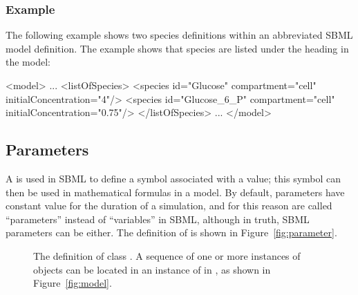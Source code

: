 \subsubsection{Example}

The following example shows two species definitions within an
abbreviated SBML model definition.  The example shows that species
are listed under the heading  in the model:

\begin{example}
<model>
    ...
    <listOfSpecies>
        <species id="Glucose" compartment="cell" initialConcentration="4"/>
        <species id="Glucose_6_P" compartment="cell" initialConcentration="0.75"/>
    </listOfSpecies>
    ...
</model>
\end{example}


\subsection{Parameters}
\label{sec:parameters}

A \Parameter is used in SBML to define a symbol associated with a
value; this symbol can then be used in mathematical formulas in a
model.  By default, parameters have constant value for the
duration of a simulation, and for this reason are called
``parameters'' instead of ``variables'' in SBML, although in
truth, SBML parameters can be either.  The definition of
\Parameter is shown in Figure~\vref{fig:parameter}.

\begin{figure}[htb]
  \centering
  \small
  \vspace{1ex}
  \caption{The definition of class \Parameter.  A
      sequence of one or more instances of \Parameter objects can
      be located in an instance of \ListOfParameters in \Model, as
      shown in Figure~\protect\ref{fig:model}.}
  \label{fig:parameter}
\end{figure}

